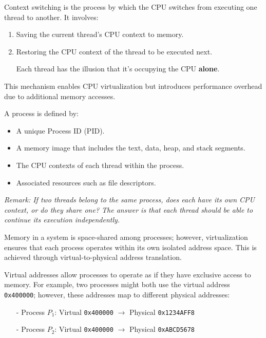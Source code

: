 \documentclass[../../compsys.tex]{subfiles}
\begin{document}
\begin{definition}
Context switching is the process by which the CPU switches from executing one thread to another. It involves:
\begin{enumerate}
    \item Saving the current thread's CPU context to memory.
    \item Restoring the CPU context of the thread to be executed next.
    \item[] Each thread has the illusion that it's occupying the CPU \textbf{alone}.
\end{enumerate}
This mechanism enables CPU virtualization but introduces performance overhead due to additional memory accesses.
\end{definition}
\vspace{10px}
\begin{definition}[Process]
A process is defined by:
\begin{itemize}
    \item A unique Process ID (PID).
    \item A memory image that includes the text, data, heap, and stack segments.
    \item The CPU contexts of each thread within the process.
    \item Associated resources such as file descriptors.
\end{itemize}
\end{definition}
\textit{Remark: If two threads belong to the same process, does each have its own CPU context, or do they share one? The answer is that each thread should be able to continue its execution independently.}
\vspace{10px}
\begin{definition}
Memory in a system is space-shared among processes; however, virtualization ensures that each process operates within its own isolated address space. This is achieved through virtual-to-physical address translation.
\end{definition}
\vspace{10px}
\begin{definition}
Virtual addresses allow processes to operate as if they have exclusive access to memory. For example, two processes might both use the virtual address \texttt{0x400000}; however, these addresses map to different physical addresses:
\begin{itemize}
  \item[-] Process \( P_1 \): Virtual \texttt{0x400000} \(\rightarrow\) Physical \texttt{0x1234AFF8}
  \item[-] Process \( P_2 \): Virtual \texttt{0x400000} \(\rightarrow\) Physical \texttt{0xABCD5678}
\end{itemize}
\end{definition}
\end{document}
